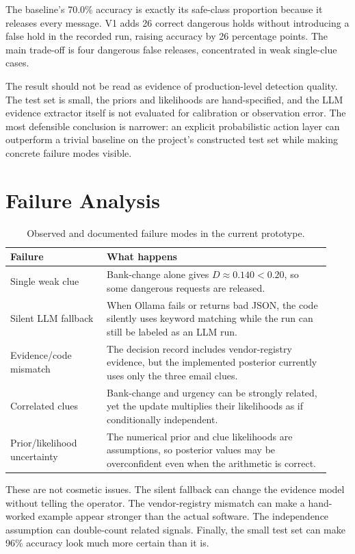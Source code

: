 \documentclass{article}
\begin{document}
The baseline's 70.0\% accuracy is exactly its safe-class proportion because it releases every message. V1 adds 26 correct dangerous holds without introducing a false hold in the recorded run, raising accuracy by 26 percentage points. The main trade-off is four dangerous false releases, concentrated in weak single-clue cases.

The result should not be read as evidence of production-level detection quality. The test set is small, the priors and likelihoods are hand-specified, and the LLM evidence extractor itself is not evaluated for calibration or observation error. The most defensible conclusion is narrower: an explicit probabilistic action layer can outperform a trivial baseline on the project's constructed test set while making concrete failure modes visible.

\section{Failure Analysis}

\begin{table}[t]
\centering
\begin{tabular}{@{}p{0.28\linewidth}p{0.65\linewidth}@{}}
\toprule
Failure & What happens \\
\midrule
Single weak clue & Bank-change alone gives \(D \approx 0.140 < 0.20\), so some dangerous requests are released. \\
Silent LLM fallback & When Ollama fails or returns bad JSON, the code silently uses keyword matching while the run can still be labeled as an LLM run. \\
Evidence/code mismatch & The decision record includes vendor-registry evidence, but the implemented posterior currently uses only the three email clues. \\
Correlated clues & Bank-change and urgency can be strongly related, yet the update multiplies their likelihoods as if conditionally independent. \\
Prior/likelihood uncertainty & The numerical prior and clue likelihoods are assumptions, so posterior values may be overconfident even when the arithmetic is correct. \\
\bottomrule
\end{tabular}
\caption{Observed and documented failure modes in the current prototype.}
\label{tab:failures}
\end{table}

These are not cosmetic issues. The silent fallback can change the evidence model without telling the operator. The vendor-registry mismatch can make a hand-worked example appear stronger than the actual software. The independence assumption can double-count related signals. Finally, the small test set can make 96\% accuracy look much more certain than it is.
\end{document}
